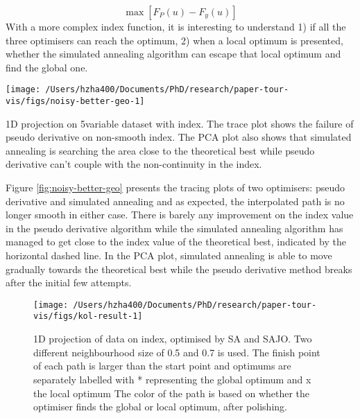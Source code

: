 \[\max \left[F_{P}(u) - F_{y}(u)\right]\] With a more complex index
function, it is interesting to understand 1) if all the three optimisers
can reach the optimum, 2) when a local optimum is presented, whether the
simulated annealing algorithm can escape that local optimum and find the
global one.

\begin{Schunk}
\begin{widefigure}

{\centering \texttt{[image: /Users/hzha400/Documents/PhD/research/paper-tour-vis/figs/noisy-better-geo-1]} 

}

\caption[1D projection on 5\-variable dataset  with  index]{1D projection on 5\-variable dataset  with  index. The trace plot shows the failure of pseudo derivative on non-smooth index. The PCA plot also shows that simulated annealing is searching the area close to the theoretical best while pseudo derivative can't couple with the non-continuity in the index.}\label{fig:noisy-better-geo}
\end{widefigure}
\end{Schunk}

Figure \ref{fig:noisy-better-geo} presents the tracing plots of two
optimisers: pseudo derivative and simulated annealing and as expected,
the interpolated path is no longer smooth in either case. There is
barely any improvement on the index value in the pseudo derivative
algorithm while the simulated annealing algorithm has managed to get
close to the index value of the theoretical best, indicated by the
horizontal dashed line. In the PCA plot, simulated annealing is able to
move gradually towards the theoretical best while the pseudo derivative
method breaks after the initial few attempts.

\begin{Schunk}
\begin{figure}

{\centering \texttt{[image: /Users/hzha400/Documents/PhD/research/paper-tour-vis/figs/kol-result-1]} 

}

\caption[1D projection of data  on  index,  optimised by SA and SAJO]{1D projection of data  on  index,  optimised by SA and SAJO. Two different neighbourhood size of 0.5 and 0.7 is used. The finish point of each path is larger than the start point and optimums are separately labelled with * representing the global optimum and x the local optimum The color of the path is based on whether the optimiser finds the global or local optimum, after polishing.}\label{fig:kol-result}
\end{figure}
\end{Schunk}

